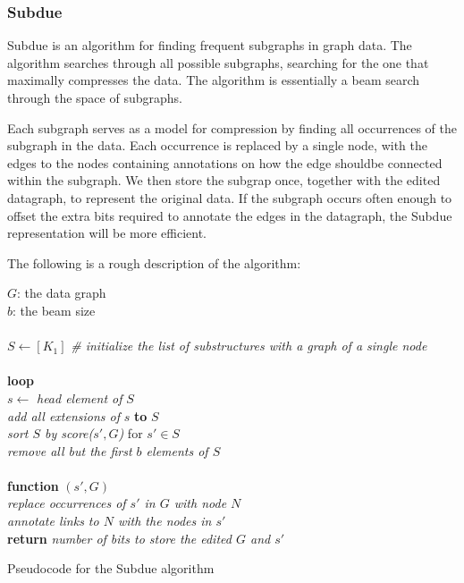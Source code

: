 \documentclass[10pt,a4paper,oneside]{article}
\begin{document}
\subsubsection*{Subdue}

Subdue \cite{ketkar2005subdue} is an algorithm for finding frequent subgraphs in graph data. The algorithm searches through all possible subgraphs, searching for the  one that maximally compresses the data. The algorithm is essentially a beam search through the space of subgraphs. 

Each subgraph serves as a model for compression by finding all occurrences of the subgraph in the data. Each occurrence is replaced by a single node, with the edges to the nodes containing annotations on how the edge shouldbe connected within the subgraph. We then store the subgrap once, together with the edited datagraph, to represent the original data. If the subgraph occurs often enough to offset the extra bits required to annotate the edges in the datagraph, the Subdue representation will be more efficient.

The following is a rough description of the algorithm:

\begin{pseudo}[h]
{
	$G$: the data graph \\
	$b$: the beam size \\
	\\
	$S \leftarrow [K_1]$ \textit{\#  initialize the list of substructures with a graph of a single node} \\
	\\
	\textbf{loop} \\
	\hspace*{5mm} $s \leftarrow $ \textit{head element of} $S$ \\
	\hspace*{5mm} \textit{add all extensions of} $s$ \textbf{to} $S$ \\
	
	\hspace*{5mm}\textit{sort $S$ by score($s', G$)} for $s' \in S$\\
	\hspace*{5mm}\textit{remove all but the first $b$ elements of $S$} \\
	\\
	\textbf{function } $(s', G)$\\
	\hspace*{5mm} \textit{replace occurrences of $s'$ in $G$ with node $N$}\\
	\hspace*{5mm} \textit{annotate links to $N$ with the nodes in $s'$}\\
	\hspace*{5mm} \textbf{return} \textit{number of bits to store the edited $G$ and $s'$ }\\
}
	\caption{Pseudocode for the Subdue algorithm}
\end{pseudo}
\end{document}
